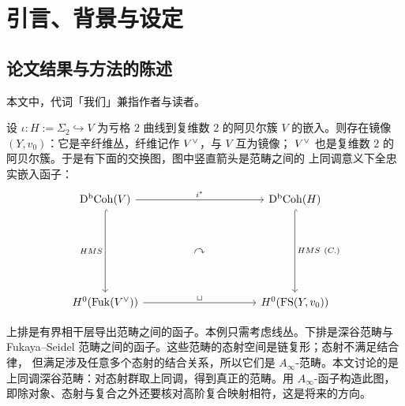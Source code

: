 \section{引言、背景与设定}

\subsection{论文结果与方法的陈述}

本文中，代词「我们」兼指作者与读者。

\begin{theorem}\label{thm:main}
设 $\iota\colon H := \Sigma_2 \hookrightarrow V$ 为亏格 $2$ 曲线到复维数 $2$ 的阿贝尔簇
$V$ 的嵌入。则存在镜像 $(Y,v_0)$：它是辛纤维丛，纤维记作 $V^{\vee}$，与 $V$ 互为镜像；
$V^{\vee}$ 也是复维数 $2$ 的阿贝尔簇。于是有下面的交换图，图中竖直箭头是范畴之间的
上同调意义下全忠实嵌入函子：
\begin{equation}\label{eq:1-1}
\begin{tikzcd}[column sep=4.2em, row sep=3.2em]
\DBCoh(V) \arrow[rr,"i^*"] \arrow[dd, hook, "HMS"'] & & \DBCoh(H) \arrow[dd, hook, "HMS\ (C.)"] \\
& \curvearrowright & \\
H^0(\mathrm{Fuk}(\Vdual)) \arrow[rr,"\sqcup"] & & H^0(\mathrm{FS}(Y,v_0))
\end{tikzcd}
\end{equation}
\end{theorem}

\begin{remark}[图示解释]\label{rem:diagram}
上排是有界相干层导出范畴之间的函子。本例只需考虑线丛。下排是深谷范畴与
Fukaya--Seidel 范畴之间的函子。这些范畴的态射空间是链复形；态射不满足结合律，
但满足涉及任意多个态射的结合关系，所以它们是 $A_\infty$-范畴。本文讨论的是
上同调深谷范畴：对态射群取上同调，得到真正的范畴。用 $A_\infty$-函子构造此图，
即除对象、态射与复合之外还要核对高阶复合映射相符，这是将来的方向。
\end{remark}


